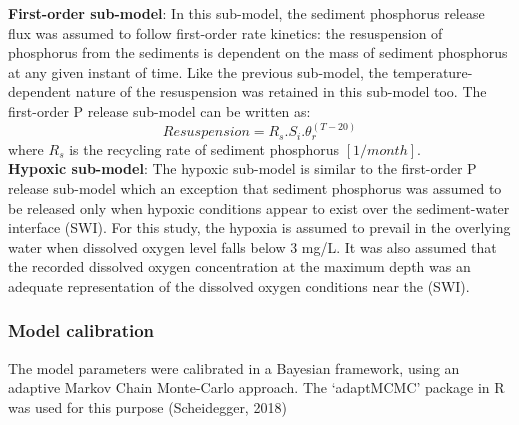 \documentclass[fleqn]{article}
\begin{document}
\textbf{First-order sub-model}: In this sub-model, the sediment phosphorus release flux was assumed to follow first-order rate kinetics: the resuspension of phosphorus from the sediments is dependent on the mass of sediment phosphorus at any given instant of time. Like the previous sub-model, the temperature-dependent nature of the resuspension was retained in this sub-model too. The first-order P release sub-model can be written as:
\begin{equation}
    Resuspension = R_s.S_i.\theta_r^{(T-20)}
    \label{eqn:FirstOrderModel}
\end{equation}
where $R_s$ is the recycling rate of sediment phosphorus $[1/month]$.\\
\textbf{Hypoxic sub-model}: The hypoxic sub-model is similar to the first-order P release sub-model which an exception that sediment phosphorus was assumed to be released only when hypoxic conditions appear to exist over the sediment-water interface (SWI). For this study, the hypoxia is assumed to prevail in the overlying water when dissolved oxygen level falls below 3 mg/L. It was also assumed that the recorded dissolved oxygen concentration at the maximum depth was an adequate representation of the dissolved oxygen conditions near the (SWI).  
\subsubsection{Model calibration}
The model parameters were calibrated in a Bayesian framework, using an adaptive Markov Chain Monte-Carlo approach. The ‘adaptMCMC’ package in R was used for this purpose (Scheidegger, 2018)

\newpage
\printbibliography
\end{document}
